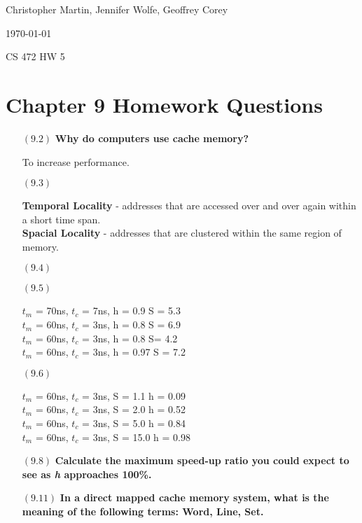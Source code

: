 \documentclass[letterpaper,10pt,titlepage]{article}
\def\name{Christopher Martin, Jennifer Wolfe, Geoffrey Corey}
\begin{document}
\hfill \name

\hfill \today

\hfill CS 472 HW 5

\section*{Chapter 9	 Homework Questions}


\begin{enumerate}
\item[$(9.2)$] \textbf{Why do computers use cache memory?}

To increase performance.

\item[$(9.3)$] \textbf{}

\textbf{Temporal Locality} - addresses that are accessed over and over again within a short time span.\\
\textbf{Spacial Locality} - addresses that are clustered within the same region of memory.

\item[$(9.4)$] \textbf{}

\item[$(9.5)$] \textbf{}

$t_m$ = 70ns, $t_c$ = 7ns, h = 0.9
S = 5.3\\

$t_m $ = 60ns, $t_c$ = 3ns, h = 0.8
S = 6.9\\

$t_m$ = 60ns, $t_c$ = 3ns, h = 0.8
S= 4.2\\

$t_m$ = 60ns, $t_c$ = 3ns, h = 0.97
S = 7.2

\item[$(9.6)$] \textbf{}

$t_m$ = 60ns, $t_c$ = 3ns, S = 1.1
h = 0.09\\

$t_m$ = 60ns, $t_c$ = 3ns, S = 2.0
h = 0.52\\

$t_m$ = 60ns, $t_c$ = 3ns, S = 5.0
h = 0.84\\

$t_m$ = 60ns, $t_c$ = 3ns, S = 15.0
h = 0.98

\item[$(9.8)$] \textbf{Calculate the maximum speed-up ratio you could expect to see as \textit{h} approaches 100\%.}

\item[$(9.11)$] \textbf{In a direct mapped cache memory system, what is the meaning of the following terms: Word, Line, Set.}


\end{enumerate}
\end{document}
